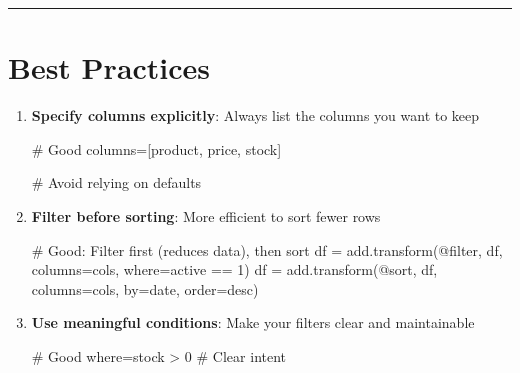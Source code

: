 \documentclass[
  letterpaper,
]{scrbook}
\newenvironment{Shaded}{\begin{snugshade}}{\end{snugshade}}
\newcommand{\CommentTok}[1]{\textcolor[rgb]{0.37,0.37,0.37}{#1}}
\newcommand{\NormalTok}[1]{\textcolor[rgb]{0.00,0.23,0.31}{#1}}
\newcommand{\OperatorTok}[1]{\textcolor[rgb]{0.37,0.37,0.37}{#1}}
\newcommand{\StringTok}[1]{\textcolor[rgb]{0.13,0.47,0.30}{#1}}
\begin{document}
\begin{center}\rule{0.5\linewidth}{0.5pt}\end{center}

\section{Best Practices}\label{best-practices-1}

\begin{enumerate}
\def\labelenumi{\arabic{enumi}.}
\item
  \textbf{Specify columns explicitly}: Always list the columns you want
  to keep

\begin{Shaded}
\begin{Highlighting}[]
\CommentTok{\# Good}
\NormalTok{columns}\OperatorTok{=}\NormalTok{[}\StringTok{\textquotesingle{}product\textquotesingle{}}\NormalTok{, }\StringTok{\textquotesingle{}price\textquotesingle{}}\NormalTok{, }\StringTok{\textquotesingle{}stock\textquotesingle{}}\NormalTok{]}

\CommentTok{\# Avoid relying on defaults}
\end{Highlighting}
\end{Shaded}
\item
  \textbf{Filter before sorting}: More efficient to sort fewer rows

\begin{Shaded}
\begin{Highlighting}[]
\CommentTok{\# Good: Filter first (reduces data), then sort}
\NormalTok{df }\OperatorTok{=}\NormalTok{ add.transform(}\StringTok{\textquotesingle{}@filter\textquotesingle{}}\NormalTok{, df, columns}\OperatorTok{=}\NormalTok{cols, where}\OperatorTok{=}\StringTok{\textquotesingle{}active == 1\textquotesingle{}}\NormalTok{)}
\NormalTok{df }\OperatorTok{=}\NormalTok{ add.transform(}\StringTok{\textquotesingle{}@sort\textquotesingle{}}\NormalTok{, df, columns}\OperatorTok{=}\NormalTok{cols, by}\OperatorTok{=}\StringTok{\textquotesingle{}date\textquotesingle{}}\NormalTok{, order}\OperatorTok{=}\StringTok{\textquotesingle{}desc\textquotesingle{}}\NormalTok{)}
\end{Highlighting}
\end{Shaded}
\item
  \textbf{Use meaningful conditions}: Make your filters clear and
  maintainable

\begin{Shaded}
\begin{Highlighting}[]
\CommentTok{\# Good}
\NormalTok{where}\OperatorTok{=}\StringTok{\textquotesingle{}stock \textgreater{} 0\textquotesingle{}}  \CommentTok{\# Clear intent}


\end{Highlighting}
\end{Shaded}
\end{enumerate}
\end{document}
